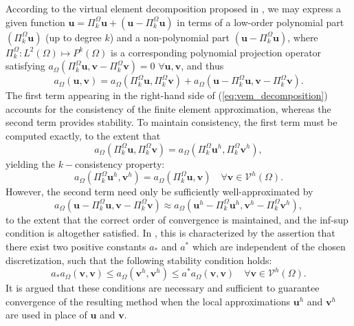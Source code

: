 	According to the virtual element decomposition proposed in \cite{Veiga:13}, we may express a given function $\bm{u} = \Pi^{\Omega}_k \bm{u} + (\bm{u} - \Pi^{\Omega}_k \bm{u})$ in terms of a low-order polynomial part $(\Pi^{\Omega}_k \bm{u})$ (up to degree $k$) and a non-polynomial part $(\bm{u} - \Pi^{\Omega}_k \bm{u})$, where $\Pi^{\Omega}_k : L^2 (\Omega) \mapsto P^k (\Omega)$ is a corresponding polynomial projection operator satisfying $a_{\Omega}(\Pi^{\Omega}_k \bm{u},\bm{v} - \Pi^{\Omega}_k \bm{v}) = 0 \, \, \forall \bm{u}, \bm{v}$, and thus
	\begin{equation}
		a_{\Omega}(\bm{u},\bm{v}) = a_{\Omega}(\Pi^{\Omega}_k \bm{u},\Pi^{\Omega}_k \bm{v}) + a_{\Omega}(\bm{u} - \Pi^{\Omega}_k \bm{u},\bm{v} - \Pi^{\Omega}_k \bm{v}).
		\label{eq:vem_decomposition}
	\end{equation}
	The first term appearing in the right-hand side of (\ref{eq:vem_decomposition}) accounts for the consistency of the finite element approximation, whereas the second term provides stability. To maintain consistency, the first term must be computed exactly, to the extent that
	\begin{equation}
		a_{\Omega}(\Pi^{\Omega}_k \bm{u},\Pi^{\Omega}_k \bm{v}) = a_{\Omega}(\Pi^{\Omega}_k \bm{u}^h,\Pi^{\Omega}_k \bm{v}^h),
	\end{equation}	
	yielding the $k-$consistency property:
	\begin{equation}
		a_{\Omega}(\Pi^{\Omega}_k \bm{u}^h,\bm{v}^h) = a_{\Omega}(\Pi^{\Omega}_k \bm{u},\bm{v}) \quad \forall \bm{v} \in \mathcal{V}^h (\Omega).
	\end{equation}
	However, the second term need only be sufficiently well-approximated by
	\begin{equation}
		a_{\Omega}(\bm{u} - \Pi^{\Omega}_k \bm{u},\bm{v} - \Pi^{\Omega}_k \bm{v}) \approx a_{\Omega}(\bm{u}^h - \Pi^{\Omega}_k \bm{u}^h,\bm{v}^h - \Pi^{\Omega}_k \bm{v}^h),
	\end{equation}
	to the extent that the correct order of convergence is maintained, and the inf-sup condition is altogether satisfied. In \cite{Veiga:13}, this is characterized by the assertion that there exist two positive constants $a_*$ and $a^*$ which are independent of the chosen discretization, such that the following stability condition holds:
	\begin{equation}
			a_* a_{\Omega} (\bm{v},\bm{v}) \leq a_{\Omega} (\bm{v}^h,\bm{v}^h) \leq a^* a_{\Omega} (\bm{v},\bm{v}) \quad \forall \bm{v} \in \mathcal{V}^h (\Omega).
	\end{equation}
	It is argued that these conditions are necessary and sufficient to guarantee convergence of the resulting method when the local approximations $\bm{u}^h$ and $\bm{v}^h$ are used in place of $\bm{u}$ and $\bm{v}$.
	
